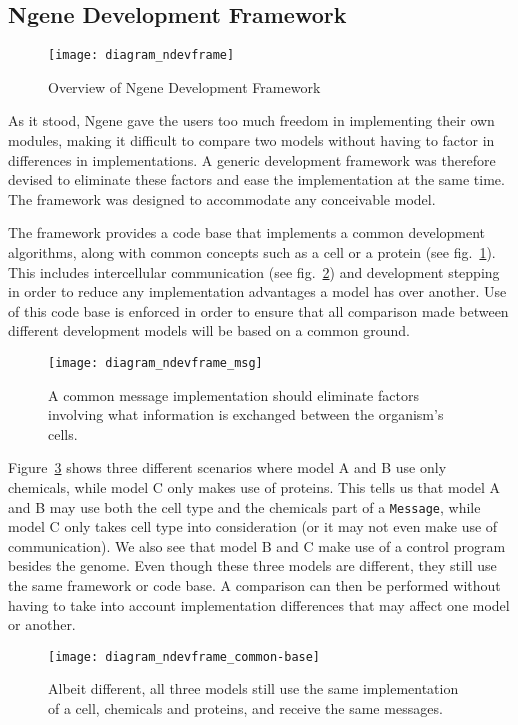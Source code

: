 \subsection{Ngene Development Framework}
\begin{figure}[!ht]
	\centering
	\texttt{[image: diagram\_ndevframe]}
	\caption{Overview of Ngene Development Framework}
	\label{fig:diagram_ndevframe}
\end{figure}

As it stood, Ngene gave the users too much freedom in implementing their own modules, making it difficult to compare two models without having to factor in differences in implementations. A generic development framework was therefore devised to eliminate these factors and ease the implementation at the same time. The framework was designed to accommodate any conceivable model.

The framework provides a code base that implements a common development algorithms, along with common concepts such as a cell or a protein (see fig.~\ref{fig:diagram_ndevframe}). This includes intercellular communication (see fig.~\ref{fig:diagram_ndevframe_msg}) and development stepping in order to reduce any implementation advantages a model has over another. Use of this code base is enforced in order to ensure that all comparison made between different development models will be based on a common ground.

\begin{figure}[!ht]
	\centering
	\texttt{[image: diagram\_ndevframe\_msg]}
	\caption{A common message implementation should eliminate factors involving what information is exchanged between the organism's cells.}
	\label{fig:diagram_ndevframe_msg}
\end{figure}

Figure~\ref{fig:diagram_ndevframe_common-base} shows three different scenarios where model A and B use only chemicals, while model C only makes use of proteins. This tells us that model A and B may use both the cell type and the chemicals part of a \texttt{Message}, while model C only takes cell type into consideration (or it may not even make use of communication). We also see that model B and C make use of a control program besides the genome. Even though these three models are different, they still use the same framework or code base. A comparison can then be performed without having to take into account implementation differences that may affect one model or another.

\begin{figure}[!ht]
	\centering
	\texttt{[image: diagram\_ndevframe\_common-base]}
	\caption{Albeit different, all three models still use the same implementation of a cell, chemicals and proteins, and receive the same messages.}
	\label{fig:diagram_ndevframe_common-base}
\end{figure}

